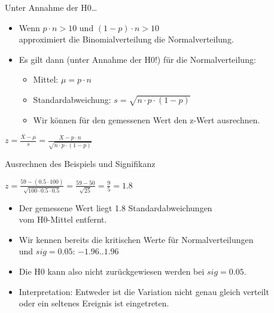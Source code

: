 \begin{frame}
  {Unter Annahme der H0\ldots}
  \begin{itemize}[<+->]
    \item Wenn \alert{$p\cdot n>10$ und $(1-p)\cdot n>10$}\\
      approximiert die Binomialverteilung die Normalverteilung.
    \item Es gilt dann (unter Annahme der H0!) für die Normalverteilung:
      \begin{itemize}
	\item Mittel: \alert{$\mu=p\cdot n$}
	\item Standardabweichung: \alert{$s=\sqrt{n\cdot p\cdot(1-p)}$}
	\item Wir können für den gemessenen Wert den z-Wert ausrechnen.
      \end{itemize}
  \end{itemize}
  \pause
  \vspace{0.5cm}
  \begin{center}
    \alert{$z=\frac{X-\mu}{s}=\frac{X-p\cdot n}{\sqrt{n\cdot p\cdot (1-p)}}$}
  \end{center}
\end{frame}

\begin{frame}
  {Ausrechnen des Beispiels und Signifikanz}
  \begin{center}
    $z=\frac{59-(0.5\cdot 100)}{\sqrt{100\cdot 0.5\cdot 0.5}}=\frac{59-50}{\sqrt{25}}=\frac{9}{5}=1.8$
  \end{center}
  \pause
  \begin{itemize}[<+->]
    \item Der gemessene Wert liegt 1.8 Standardabweichungen\\
      vom H0-Mittel entfernt.
    \item Wir kennen bereits die kritischen Werte für Normalverteilungen\\
      und $sig=0.05$: \alert{$-1.96 .. 1.96$}
    \item Die H0 kann also nicht zurückgewiesen werden bei $sig=0.05$.
      \vspace{\baselineskip}
    \item Interpretation: Entweder ist die Variation nicht genau gleich verteilt\\
      \alert{oder ein seltenes Ereignis ist eingetreten.}
  \end{itemize}
\end{frame}

